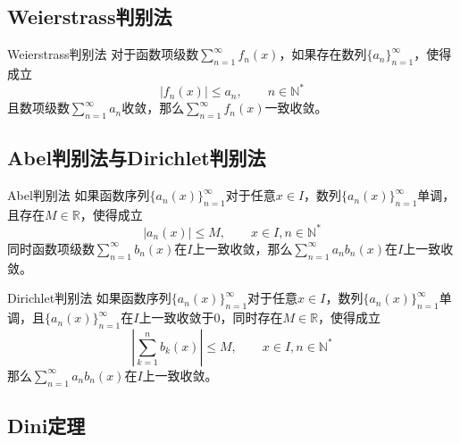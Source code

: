 \documentclass[lang = cn, scheme = chinese, thmcnt = section]{elegantbook}
\newcommand{\N}{\mathbb{N}}            %
\newcommand{\R}{\mathbb{R}}            %
\newcommand{\dis}{\displaystyle}
\begin{document}
\subsection{Weierstrass判别法}

\begin{theorem}{Weierstrass判别法}
	对于函数项级数$\dis\sum_{n=1}^{\infty}f_n(x)$，如果存在数列$\{a_n\}_{n=1}^{\infty}$，使得成立
	$$
	|f_n(x)|\le a_n,\qquad n\in\N^*
	$$
	且数项级数$\dis\sum_{n=1}^{\infty}a_n$收敛，那么$\dis\sum_{n=1}^{\infty}f_n(x)$一致收敛。
\end{theorem}

\subsection{Abel判别法与Dirichlet判别法}

\begin{theorem}{Abel判别法}
	如果函数序列$\{a_n(x)\}_{n=1}^{\infty}$对于任意$x\in I$，数列$\{a_n(x)\}_{n=1}^{\infty}$单调，且存在$M\in\R$，使得成立
	\[ 
	|a_n(x)|\le M,\qquad x\in I,n\in\N^*
	 \]
	同时函数项级数$\dis\sum_{n=1}^{\infty}b_n(x)$在$I$上一致收敛，那么$\dis\sum_{n=1}^{\infty}a_nb_n(x)$在$I$上一致收敛。
\end{theorem}

\begin{theorem}{Dirichlet判别法}
	如果函数序列$\{a_n(x)\}_{n=1}^{\infty}$对于任意$x\in I$，数列$\{a_n(x)\}_{n=1}^{\infty}$单调，且$\{a_n(x)\}_{n=1}^{\infty}$在$I$上一致收敛于$0$，同时存在$M\in\R$，使得成立
	\[ 
	\left|\sum_{k=1}^{n}b_k(x)\right|\le M,\qquad x\in I,n\in\N^*
	\]
	那么$\dis\sum_{n=1}^{\infty}a_nb_n(x)$在$I$上一致收敛。
\end{theorem}

\subsection{Dini定理}
\end{document}
